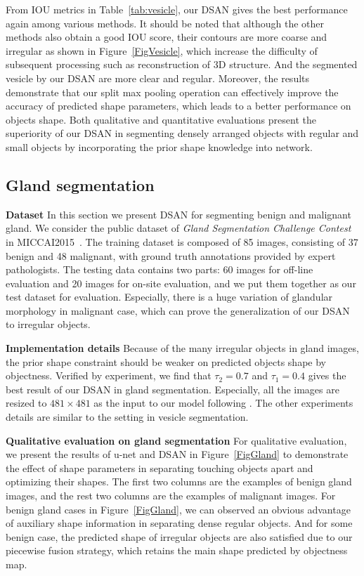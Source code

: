 From IOU metrics in Table~\ref{tab:vesicle}, our DSAN gives the best performance again among various methods.
It should be noted that although the other methods also obtain a good IOU score, their contours are more coarse and irregular as shown in Figure~\ref{FigVesicle}, which increase the difficulty of subsequent processing such as reconstruction of 3D structure.
And the segmented vesicle by our DSAN are more clear and regular.
Moreover, the results demonstrate that our split max pooling operation can effectively improve the accuracy of predicted shape parameters, which leads to a better performance on objects shape.
Both qualitative and quantitative evaluations present the superiority of our DSAN in segmenting densely arranged objects with regular and small objects by incorporating the prior shape knowledge into network.

\subsection{Gland segmentation}
\textbf{Dataset}
In this section we present DSAN for segmenting benign and malignant gland.
We consider the public dataset of \emph{Gland Segmentation Challenge Contest} in MICCAI2015~\cite{Sirinukunwattana2015a}.
The training dataset is composed of 85 images, consisting of 37 benign and 48 malignant, with ground truth annotations provided by expert pathologists.
The testing data contains two parts: 60 images for off-line evaluation and 20 images for on-site evaluation, and we put them together as our test dataset for evaluation.
Especially, there is a huge variation of glandular morphology in malignant case, which can prove the generalization of our DSAN to irregular objects.

\textbf{Implementation details}
Because of the many irregular objects in gland images, the prior shape constraint should be weaker on predicted objects shape by objectness.
Verified by experiment, we find that $\tau_2=0.7$ and $\tau_1=0.4 $ gives the best result of our DSAN in gland segmentation.
Especially, all the images are resized to $481\times 481$ as the input to our model following \cite{Chen2014a}.
The other experiments details are similar to the setting in vesicle segmentation.

\textbf{Qualitative evaluation on gland segmentation}
For qualitative evaluation, we present the results of u-net and DSAN in Figure~\ref{FigGland} to demonstrate the effect of shape parameters in separating touching objects apart and optimizing their shapes.
The first two columns are the examples of benign gland images, and the rest two columns are the examples of malignant images.
For benign gland cases in Figure~\ref{FigGland}, we can observed an obvious advantage of auxiliary shape information in separating dense regular objects.
And for some benign case, the predicted shape of irregular objects are also satisfied due to our piecewise fusion strategy, which retains the main shape predicted by objectness map.

